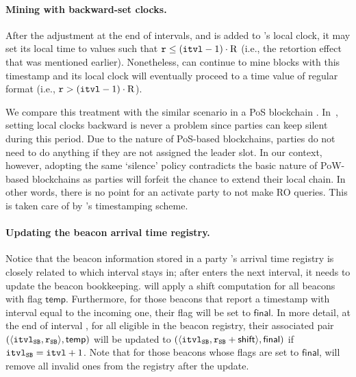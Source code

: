 \paragraph{Mining with backward-set clocks.}
%
After the adjustment at the end of intervals, and \shift is added to \party's local clock, it may set its local time to values \protocolTime{\interval}{\round} such that $\mathtt{r} \le (\mathtt{itvl} - 1) \cdot \mathrm{R}$ (i.e., the retortion effect that was mentioned earlier).
%
Nonetheless, \party can continue to mine blocks with this timestamp and its local clock will eventually proceed to a time value of regular format (i.e., $\mathtt{r} > (\mathtt{itvl} - 1) \cdot \mathrm{R}$).

We compare this treatment with the similar scenario in a PoS blockchain \cite{EC:BGKRZ21}.
%
In~\cite{EC:BGKRZ21}, setting local clocks backward is never a problem since parties can keep silent during this period.
%
Due to the nature of PoS-based blockchains, parties do not need to do anything if they are not assigned the leader slot.
%
In our context, however, adopting the same `silence' policy contradicts the basic nature of PoW-based blockchains as parties will forfeit the chance to extend their local chain.
%
In other words, there is no point for an activate party to not make RO queries.
%
This is taken care of by \timekeeper's timestamping scheme.

\paragraph{Updating the beacon arrival time registry.}
%
Notice that the beacon information stored in a party \party's arrival time registry is closely related to which interval \party stays in; after \party enters the next interval, it needs to update the beacon bookkeeping.
%
\party will apply a shift computation for all beacons with flag $\mathsf{temp}$.
%
Furthermore, for those beacons that report a timestamp with interval equal to the incoming one, their flag will be set to $\mathsf{final}$.
%
In more detail, at the end of interval \interval, for all eligible \beacon in the beacon registry, their associated pair $(\langle \mathtt{itvl}_\mathtt{SB}, \mathtt{r}_\mathtt{SB} \rangle, \mathsf{temp})$ will be updated to $(\langle \mathtt{itvl}_\mathtt{SB}, \mathtt{r}_\mathtt{SB} + \mathsf{shift} \rangle, \mathsf{final})$ if $\mathtt{itvl}_\mathtt{SB} = \mathtt{itvl} + 1$.
%
Note that for those beacons whose flags are set to $\mathsf{final}$, \party will remove all invalid ones from the registry after the update.
